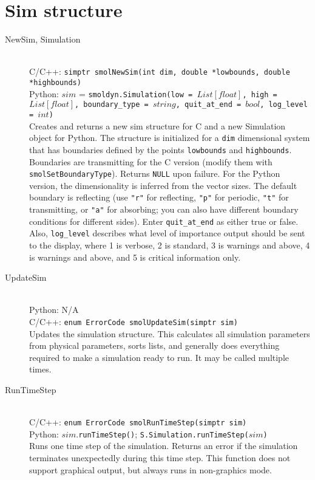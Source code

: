 \documentclass {scrbook}
\newcommand {\ttt} {\texttt}
\begin{document}
\section{Sim structure}

\begin{description}

\item[NewSim, Simulation]
\hfill \\
C/C++: \ttt{simptr smolNewSim(int dim, double *lowbounds, double *highbounds)}\\
Python: $sim$ = \ttt{smoldyn.Simulation(low = $List[float]$, high = $List[float]$, boundary\_type = $string$, quit\_at\_end = $bool$, log\_level = $int$)}\\
Creates and returns a new sim structure for C and a new Simulation object for Python. The structure is initialized for a \ttt{dim} dimensional system that has boundaries defined by the points \ttt{lowbounds} and \ttt{highbounds}. Boundaries are transmitting for the C version (modify them with \ttt{smolSetBoundaryType}). Returns \ttt{NULL} upon failure. For the Python version, the dimensionality is inferred from the vector sizes. The default boundary is reflecting (use \ttt{"r"} for reflecting, \ttt{"p"} for periodic, \ttt{"t"} for transmitting, or \ttt{"a"} for absorbing; you can also have different boundary conditions for different sides). Enter \ttt{quit\_at\_end} as either true or false. Also, \ttt{log\_level} describes what level of importance output should be sent to the display, where 1 is verbose, 2 is standard, 3 is warnings and above, 4 is warnings and above, and 5 is critical information only.

\item[UpdateSim]
\hfill \\
Python: N/A\\
C/C++: \ttt{enum ErrorCode smolUpdateSim(simptr sim)}\\
Updates the simulation structure. This calculates all simulation parameters from physical parameters, sorts lists, and generally does everything required to make a simulation ready to run. It may be called multiple times.

\item[RunTimeStep]
\hfill \\
C/C++: \ttt{enum ErrorCode smolRunTimeStep(simptr sim)}\\
Python: $sim$.\ttt{runTimeStep()}; \ttt{S.Simulation.runTimeStep($sim$)}\\
Runs one time step of the simulation. Returns an error if the simulation terminates unexpectedly during this time step. This function does not support graphical output, but always runs in non-graphics mode.


\end{description}
\end{document}
